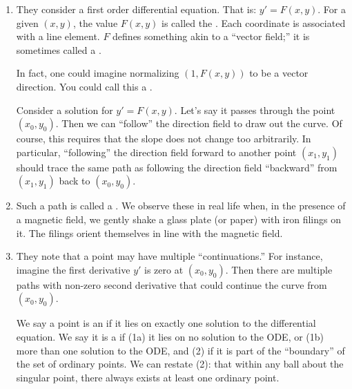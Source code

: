 \documentclass[11pt, oneside]{amsart}
\begin{document}
\begin{enumerate}
  \item They consider a first order differential equation. That is: $y'
  = F(x, y)$. For a given $(x, y)$, the value $F(x, y)$ is called the
  . Each coordinate is associated with a line
  element. $F$ defines something akin to a ``vector field;'' it is
  sometimes called a .

  In fact, one could imagine normalizing $(1, F(x, y))$ to be a vector
  direction. You could call this a .

  Consider a solution for $y' = F(x, y)$. Let's say it passes through
  the point $(x_0, y_0)$. Then we can ``follow'' the direction field to
  draw out the curve. Of course, this requires that the slope does not
  change too arbitrarily. In particular, ``following'' the direction
  field forward to another point $(x_1, y_1)$ should trace the same path
  as following the direction field ``backward'' from $(x_1, y_1)$ back
  to $(x_0, y_0)$.

  \item Such a path is called a . We observe these in
  real life when, in the presence of a magnetic field, we gently shake a
  glass plate (or paper) with iron filings on it. The filings orient
  themselves in line with the magnetic field.

  \item They note that a point may have multiple ``continuations.'' For
  instance, imagine the first derivative $y'$ is zero at $(x_0, y_0)$.
  Then there are multiple paths with non-zero second derivative that
  could continue the curve from $(x_0, y_0)$.

  We say a point is an  if it lies on exactly one
  solution to the differential equation. We say it is a  if (1a) it lies on no solution to the ODE, or (1b) more than
  one solution to the ODE, and (2) if it is part of the ``boundary'' of
  the set of ordinary points. We can restate (2): that within any ball
  about the singular point, there always exists at least one ordinary
  point.
\end{enumerate}
\end{document}
